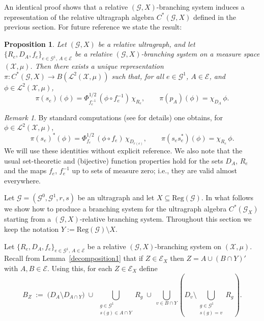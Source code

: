 \documentclass[12pt, reqno]{amsart}
\newtheorem{proposition}[theorem]{Proposition}
\theoremstyle{definition}
\theoremstyle{remark}
\newtheorem{remark}[theorem]{Remark}
\numberwithin{equation}{section}
\begin{document}
An identical proof shows that a relative $(\mathcal{G},X)$-branching system induces a
representation of the relative ultragraph algebra $C^*(\mathcal{G},X)$ defined in the previous
section. For future reference we state the result:

\begin{proposition}\label{relativerepinducedbybranchingsystems}
Let $(\mathcal{G}, X)$ be a relative ultragraph, and let
$\{R_e,D_A,f_e\}_{e\in \mathcal{G}^1,\, A\in \mathcal{E}}$ be a relative $(\mathcal{G},X)$-branching
system on a measure space $(\mathcal{X},\mu)$. Then there exists a unique representation
$\pi:C^*(\mathcal{G},X) \to B(\mathcal{L}^2(\mathcal{X},\mu))$ such that, for all
$e \in \mathcal{G}^1$, $A \in \mathcal{E}$, and $\phi \in \mathcal{L}^2(\mathcal{X},\mu)$,
\[
\pi(s_e)(\phi)=\Phi_{f_e^{-1}}^{1/2}\,(\phi \circ f_e^{-1})\,\chi_{R_e},
\qquad
\pi(p_A)(\phi)=\chi_{D_A}\,\phi.
\]
\end{proposition}

\begin{remark}
By standard computations (see \cite{DDH} for details) one obtains, for $\phi \in \mathcal{L}^2(\mathcal{X},\mu)$,
\[
\pi(s_e)^*(\phi) = \Phi_{f_e}^{1/2}\, (\phi \circ f_e)\, \chi_{D_{r(e)}},
\qquad
\pi(s_e s_e^*)(\phi) = \chi_{R_e}\,\phi.
\]
We will use these identities without explicit reference. We also note that the usual set-theoretic
and (bijective) function properties hold for the sets $D_A$, $R_e$ and the maps $f_e$, $f_e^{-1}$
up to sets of measure zero; i.e., they are valid almost everywhere.
\end{remark}



Let $\mathcal{G}=(\mathcal{G}^0,\mathcal{G}^1,r,s)$ be an ultragraph and let $X\subseteq \mathrm{Reg}(\mathcal{G})$.
In what follows we show how to produce a branching system for the ultragraph algebra
$C^*(\mathcal{G}_X)$ starting from a $(\mathcal{G},X)$-relative branching system. Throughout this
section we keep the notation $Y:=\mathrm{Reg}(\mathcal{G})\setminus X$.

Let $\{R_e,D_A,f_e\}_{e \in \mathcal{G}^1,\,A \in \mathcal{E}}$ be a relative
$(\mathcal{G},X)$-branching system on $(\mathcal{X},\mu)$. Recall from
Lemma~\ref{decomposition1} that if $Z\in \mathcal{E}_X$ then $Z=A \cup (B\cap Y)'$ with
$A,B \in \mathcal{E}$. Using this, for each $Z\in\mathcal{E}_X$ define
\[
B_Z \;:=\; \bigl(D_A \setminus D_{A\cap Y}\bigr)
\;\cup\;
\bigcup_{\substack{g \in \mathcal{G}^1 \\ s(g)\in A\cap Y}} R_g
\;\cup\;
\bigcup_{v \in B\cap Y}
\left(
D_v \setminus \bigcup_{\substack{g \in \mathcal{G}^1 \\ s(g)=v}} R_g
\right).
\]
\end{document}
